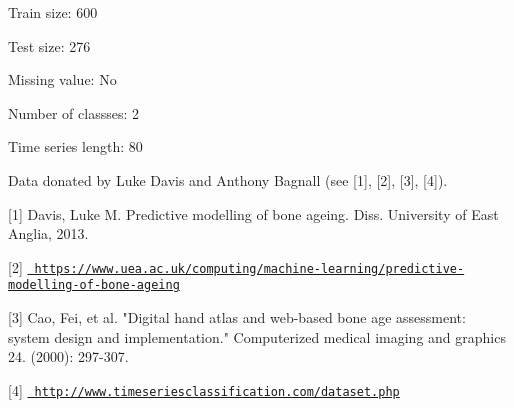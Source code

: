 Train size\+: 600

Test size\+: 276

Missing value\+: No

Number of classses\+: 2

Time series length\+: 80

Data donated by Luke Davis and Anthony Bagnall (see \mbox{[}1\mbox{]}, \mbox{[}2\mbox{]}, \mbox{[}3\mbox{]}, \mbox{[}4\mbox{]}).

\mbox{[}1\mbox{]} Davis, Luke M. Predictive modelling of bone ageing. Diss. University of East Anglia, 2013.

\mbox{[}2\mbox{]} \href{https://www.uea.ac.uk/computing/machine-learning/predictive-modelling-of-bone-ageing}{\texttt{ https\+://www.\+uea.\+ac.\+uk/computing/machine-\/learning/predictive-\/modelling-\/of-\/bone-\/ageing}}

\mbox{[}3\mbox{]} Cao, Fei, et al. "{}\+Digital hand atlas and web-\/based bone age assessment\+: system design and implementation."{} Computerized medical imaging and graphics 24. (2000)\+: 297-\/307.

\mbox{[}4\mbox{]} \href{http://www.timeseriesclassification.com/dataset.php}{\texttt{ http\+://www.\+timeseriesclassification.\+com/dataset.\+php}} 